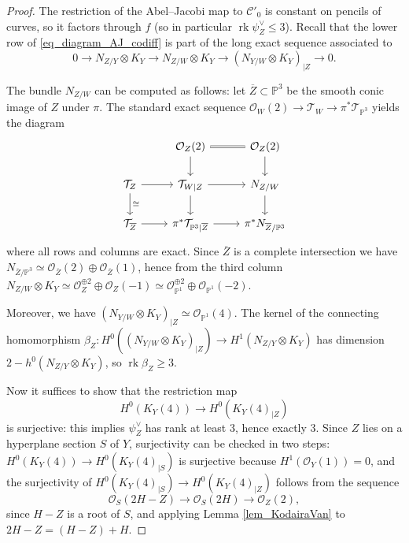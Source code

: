 \documentclass[11pt]{amsart}
\theoremstyle{definition}
\newcommand{\pr}[1]{\mathbb P^{#1}}
\DeclareMathOperator{\rk}{rk}
\DeclareMathOperator{\Pic}{Pic\,}
\newcommand{\sO}{\mathcal{O}}
\newcommand{\sT}{\mathcal{T}}
\newcommand{\sC}{\mathcal{C}}
\newcommand{\sE}{\mathcal{E}}
\newcommand{\AAA}[1]{\textcolor{red}{#1}}
\renewcommand{\P}{\mathbb{P}}
\begin{document}
\begin{proof}
The restriction of the Abel--Jacobi map to $\sC'_0$ is constant on pencils of curves, so it factors through $f$ (so in particular $\rk\psi_Z^\vee\leq 3$). Recall that the lower row of \eqref{eq_diagram_AJ_codiff} is part of the long exact sequence associated to 
$$0\longrightarrow N_{Z/Y} \otimes K_Y \longrightarrow N_{Z/W} \otimes K_Y \longrightarrow (N_{Y/W}\otimes K_Y)_{|Z} \longrightarrow 0.$$


The bundle $N_{Z/W}$ can be computed as follows: let $\overline{Z} \subset \pr 3$ be the smooth conic image of $Z$ under $\pi$. The standard exact sequence $ \sO_W(2)\to \sT_W \to \pi^*\sT_{\pr 3} $ yields the diagram 
\begin{equation*}\label{eq_normal_Z_in_E}
\begin{tikzcd}[]
 & \sO_Z(2) \ar[equal]{r} \dar & \sO_Z(2) \dar\\
\sT_Z \rar \ar["\cong"]{d} & \sT_{W|Z} \rar \dar & N_{Z/W} \dar\\
\sT_{\overline{Z}} \rar &  \pi^*\sT_{\pr 3|\overline{Z}}\rar & \pi^*N_{\overline Z/\pr 3}
\end{tikzcd}
\end{equation*}
where all rows and columns are exact. Since $\overline Z$ is a complete intersection we have $N_{\overline Z/\pr 3}\simeq \sO_{\overline Z}(2)\oplus \sO_{\overline{Z}}(1)$, hence from the third column $N_{Z/W} \otimes K_Y \simeq \sO_{Z}^{\oplus 2}\oplus \sO_{Z}(-1)\simeq \sO_{\pr 1}^{\oplus 2}\oplus \sO_{\pr 1}(-2)$.

Moreover, we have $(N_{Y/W}\otimes K_Y)_{|Z}\simeq \sO_{\pr 1}(4)$. The kernel of the connecting homomorphism $\beta_Z\colon H^0((N_{Y/W}\otimes K_Y)_{|Z}) \to H^1(N_{Z/Y} \otimes K_Y)$ has dimension $2-h^0(N_{Z/Y}\otimes K_Y)$, so $\rk \beta_Z \geq 3$.  

Now it suffices to show that the restriction map $$H^0(K_Y(4))\longrightarrow H^0(K_Y(4)_{|Z})$$ is surjective: this implies $\psi_Z^\vee$ has rank at least 3, hence exactly 3.
Since $Z$ lies on a hyperplane section $S$ of $Y$, surjectivity can be checked in two steps: $H^0(K_Y(4))\to H^0(K_Y(4)_{|S})$ is surjective because $H^1(\sO_Y(1))=0$, and the surjectivity of $H^0(K_Y(4)_{|S})\to H^0(K_Y(4)_{|Z})$ follows from the sequence 
$$ \sO_S(2H - Z) \longrightarrow \sO_S(2H) \longrightarrow \sO_Z (2), $$
since $H-Z$ is a root of $S$, and applying Lemma \ref{lem_KodairaVan} to $2H-Z=(H-Z)+H$.
\end{proof}
\end{document}
